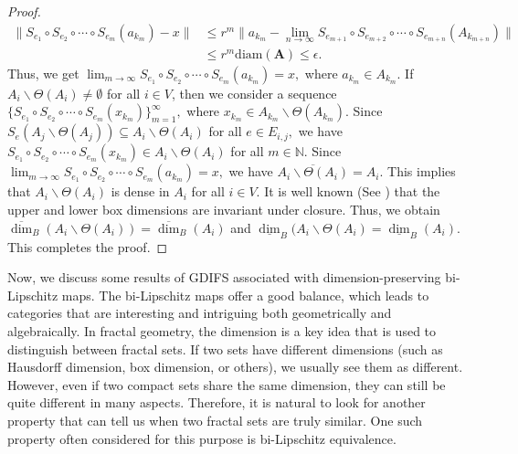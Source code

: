 \documentclass[a4paper,12pt,reqno]{amsart}
\numberwithin{equation}{section}
\theoremstyle{definition}
\theoremstyle{remark}
\numberwithin{equation}{section}
\begin{document}
\begin{proof}
\begin{align*}
  \|S_{e_1} \circ S_{e_2}\circ \cdots  \circ S_{e_m}(a_{k_m})-x\|&\leq r^{m}\|a_{k_m}-\lim_{n \to \infty} S_{e_{m+1}} \circ S_{e_{m+2}}\circ \cdots  \circ S_{e_{m+n}}(A_{k_{m+n}})\|\\&\leq r^{m} \text{diam}(\mathbf{A})\leq \epsilon. \end{align*}
Thus, we get $\lim_{ m \to \infty} S_{e_1} \circ S_{e_2}\circ \cdots  \circ S_{e_m}(a_{k_m})=x,$ where $a_{k_m}\in A_{k_m}.$  If $A_i \backslash \Theta (A_i) \neq \emptyset$ for all $i\in V$, then we consider a sequence $\{S_{e_1} \circ S_{e_2}\circ \cdots  \circ S_{e_m}(x_{k_m})\}_{m=1}^{\infty},$ where $x_{k_m}\in A_{k_m}\backslash \Theta (A_{k_m}).$ Since $S_e(A_j \backslash \Theta (A_j))\subseteq A_i \backslash \Theta (A_i)$ for all $e\in E_{i,j},$ we have $S_{e_1} \circ S_{e_2}\circ \cdots  \circ S_{e_m}(x_{k_m})\in A_i \backslash \Theta (A_i)$ for all $m\in \mathbb{N}$. Since $\lim_{ m \to \infty} S_{e_1} \circ S_{e_2}\circ \cdots  \circ S_{e_m}(a_{k_m})=x,$ we have $\overline{A_i \backslash \Theta (A_i)}=A_i.$ This implies that $A_i \backslash \Theta (A_i)$ is dense in $A_i$ for all $i\in V.$
It is well known (See \cite{F}) that the upper and lower box dimensions are invariant under closure. Thus, we obtain  $\overline{\dim}_B (A_i \backslash \Theta (A_i))=\overline{\dim}_B (A_i)$ and $\underline{\dim}_B (A_i \backslash \Theta (A_i)=\underline{\dim}_B (A_i).$ This completes the proof.
\end{proof}
Now, we discuss some results of GDIFS associated with dimension-preserving bi-Lipschitz maps. The bi-Lipschitz maps offer a good balance, which leads to categories that are interesting and intriguing both geometrically and algebraically. In fractal geometry, the dimension is a key idea that is used to distinguish between fractal sets. If two sets have different dimensions (such as Hausdorff dimension, box dimension, or others), we usually see them as different. However, even if two compact sets share the same dimension, they can still be quite different in many aspects. Therefore, it is natural to look for another property that can tell us when two fractal sets are truly similar. One such property often considered for this purpose is bi-Lipschitz equivalence.
 
\end{document}
